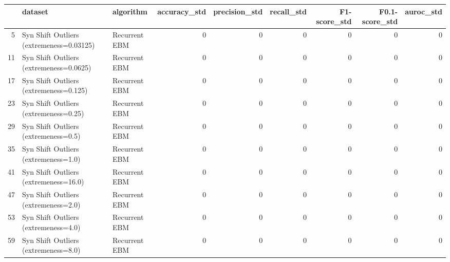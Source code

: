 \begin{tabular}{rllrrrrrr}
\hline
    & dataset                                  & algorithm     &   accuracy\_std &   precision\_std &   recall\_std &   F1-score\_std &   F0.1-score\_std &   auroc\_std \\
\hline
  5 & Syn Shift Outliers (extremeness=0.03125) & Recurrent EBM &              0 &               0 &            0 &              0 &                0 &           0 \\
 11 & Syn Shift Outliers (extremeness=0.0625)  & Recurrent EBM &              0 &               0 &            0 &              0 &                0 &           0 \\
 17 & Syn Shift Outliers (extremeness=0.125)   & Recurrent EBM &              0 &               0 &            0 &              0 &                0 &           0 \\
 23 & Syn Shift Outliers (extremeness=0.25)    & Recurrent EBM &              0 &               0 &            0 &              0 &                0 &           0 \\
 29 & Syn Shift Outliers (extremeness=0.5)     & Recurrent EBM &              0 &               0 &            0 &              0 &                0 &           0 \\
 35 & Syn Shift Outliers (extremeness=1.0)     & Recurrent EBM &              0 &               0 &            0 &              0 &                0 &           0 \\
 41 & Syn Shift Outliers (extremeness=16.0)    & Recurrent EBM &              0 &               0 &            0 &              0 &                0 &           0 \\
 47 & Syn Shift Outliers (extremeness=2.0)     & Recurrent EBM &              0 &               0 &            0 &              0 &                0 &           0 \\
 53 & Syn Shift Outliers (extremeness=4.0)     & Recurrent EBM &              0 &               0 &            0 &              0 &                0 &           0 \\
 59 & Syn Shift Outliers (extremeness=8.0)     & Recurrent EBM &              0 &               0 &            0 &              0 &                0 &           0 \\
\hline
\end{tabular}

